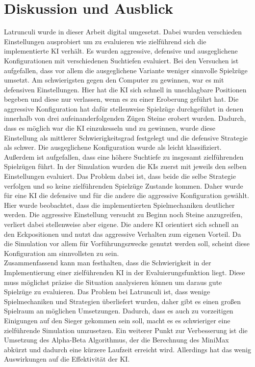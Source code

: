 
\chapter{Diskussion und Ausblick}
\label{ch:fazit}
Latrunculi wurde in dieser Arbeit digital umgesetzt. Dabei wurden verschieden Einstellungen ausprobiert um zu evaluieren wie zielführend sich die implementierte KI verhält. Es wurden aggressive, defensive und ausgeglichene Konfigurationen mit verschiedenen Suchtiefen evaluiert. Bei den Versuchen ist aufgefallen, dass vor allem die ausgeglichene Variante weniger sinnvolle Spielzüge umsetzt. Am schwierigsten gegen den Computer zu gewinnen, war es mit defensiven Einstellungen. Hier hat die KI sich schnell in unschlagbare Positionen begeben und diese nur verlassen, wenn es zu einer Eroberung geführt hat. Die aggressive Konfiguration hat dafür stellenweise Spielzüge durchgeführt in denen innerhalb von drei aufeinanderfolgenden Zügen Steine erobert wurden. Dadurch, dass es möglich war die KI einzukesseln und zu gewinnen, wurde diese Einstellung als mittlerer Schwierigkeitsgrad festgelegt und die defensive Strategie als schwer. Die ausgeglichene Konfiguration wurde als leicht klassifiziert. Außerdem ist aufgefallen, dass eine höhere Suchtiefe zu insgesamt zielführenden Spielzügen führt. In der Simulation wurden die KIs zuerst mit jeweils den selben Einstellungen evaluiert. Das Problem dabei ist, dass beide die selbe Strategie verfolgen und so keine zielführenden Spielzüge Zustande kommen. Daher wurde für eine KI die defensive und für die andere die aggressive Konfiguration gewählt. Hier wurde beobachtet, dass die implementierten Spielmechaniken deutlicher werden. Die aggressive Einstellung versucht zu Beginn noch Steine anzugreifen, verliert dabei stellenweise aber eigene. Die andere KI orientiert sich schnell an den Eckpositionen und nutzt das aggressive Verhalten zum eigenen Vorteil. Da die Simulation vor allem für Vorführungszwecke genutzt werden soll, scheint diese Konfiguration am sinnvollsten zu sein.\\
Zusammenfassend kann man festhalten, dass die Schwierigkeit in der Implementierung einer zielführenden KI in der Evaluierungsfunktion liegt. Diese muss möglichst präzise die Situation analysieren können um daraus gute Spielzüge zu evaluieren. Das Problem bei Latrunculi ist, dass wenige Spielmechaniken und Strategien überliefert wurden, daher gibt es einen großen Spielraum an möglichen Umsetzungen. Dadurch, dass es auch zu vorzeitigen Einigungen auf den Sieger gekommen sein soll, macht es es schwieriger eine zielführende Simulation umzusetzen.
Ein weiterer Punkt zur Verbesserung ist die Umsetzung des Alpha-Beta Algorithmus, der die Berechnung des MiniMax abkürzt und dadurch eine kürzere Laufzeit erreicht wird. Allerdings hat das wenig Auswirkungen auf die Effektivität der KI.

